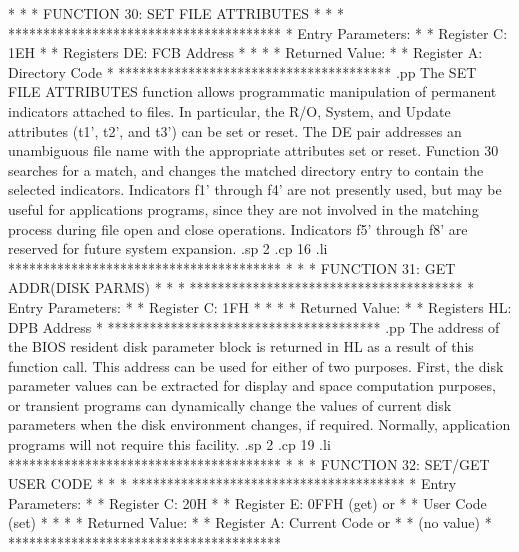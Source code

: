 *                                     *
*  FUNCTION 30: SET FILE ATTRIBUTES   *
*                                     *
***************************************
*  Entry Parameters:                  *
*      Register   C:  1EH             *
*      Registers DE:  FCB Address     *
*                                     *
*  Returned   Value:                  *
*      Register   A:  Directory Code  *
***************************************
.pp
The SET FILE ATTRIBUTES function allows programmatic manipulation
of permanent indicators attached to files.  In particular, the
R/O, System, and Update attributes (t1', t2', and t3') can be set or
reset.  The DE pair addresses an unambiguous file
name with the appropriate attributes set or reset.  Function
30 searches for a match, and changes the matched directory
entry to contain the selected indicators.  Indicators f1'
through f4' are not presently used, but may be useful for
applications programs, since they are not involved in the
matching process during file open and close operations.
Indicators f5' through f8' are reserved for
future system expansion.
.sp 2
.cp 16
.li
***************************************
*                                     *
*  FUNCTION 31: GET ADDR(DISK PARMS)  *
*                                     *
***************************************
*  Entry Parameters:                  *
*      Register   C:  1FH             *
*                                     *
*  Returned   Value:                  *
*      Registers HL:  DPB Address     *
***************************************
.pp
The address of the BIOS resident disk parameter block is
returned in HL as a result of this function call.  This
address can be used for either of two purposes.  First,
the disk parameter values can be extracted for
display and space computation purposes,
or transient programs can dynamically change the values
of current disk parameters when the disk environment
changes, if required.  Normally, application programs
will not require this facility.
.sp 2
.cp 19
.li
***************************************
*                                     *
*  FUNCTION 32: SET/GET USER CODE     *
*                                     *
***************************************
*  Entry Parameters:                  *
*      Register   C:  20H             *
*      Register   E:  0FFH (get) or   *
*                     User Code (set) *
*                                     *
*  Returned   Value:                  *
*      Register   A:  Current Code or *
*                     (no value)      *
***************************************
